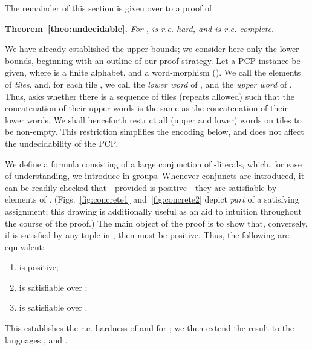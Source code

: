 \documentclass{article}
\newenvironment{swetheorem}[1]{\par\medskip\noindent\textbf{#1.}\hspace*{0.5em}\em}{\par\smallskip}
\begin{document}
\bigskip

The remainder of this section is given over to a proof of
\begin{swetheorem}{Theorem~\ref{theo:undecidable}}
For ,
 is r.e.-hard, and
 is r.e.-complete.
\end{swetheorem}

We have already established the upper bounds; we consider here only
the lower bounds, beginning with an outline of our proof strategy.
Let a PCP-instance  be given,
where  is a finite alphabet, and  a word-morphism ().  We call the elements of 
    {\em tiles}, and, for each tile , we call  the {\em
      lower word} of , and  the {\em upper word} of
    . Thus,  asks whether there is a sequence of tiles
    (repeats allowed) such that the concatenation of their upper words
    is the same as the concatenation of their lower words. We shall
    henceforth restrict all (upper and lower) words on tiles to be
    non-empty.  This restriction simplifies the encoding below, and
    does not affect the undecidability of the PCP.

We define a formula  consisting of a large conjunction of
-literals, which, for ease of understanding, we introduce in
groups. Whenever conjuncts are introduced, it can be readily checked
that---provided  is positive---they are satisfiable by elements
of . (Figs.~\ref{fig:concrete1} and~\ref{fig:concrete2}
depict {\em part} of a satisfying assignment; this drawing is
additionally useful as an aid to intuition throughout the course of
the proof.)  The main object of the proof is to show that, conversely,
if  is satisfied by any tuple in , then 
must be positive. Thus, the following are equivalent:
\begin{enumerate}
\item  is positive;
\item  is satisfiable over ;
\item  is satisfiable over .
\end{enumerate}
This establishes the r.e.-hardness of  and
 for ; we then extend the result to the
languages ,  and .
\end{document}
